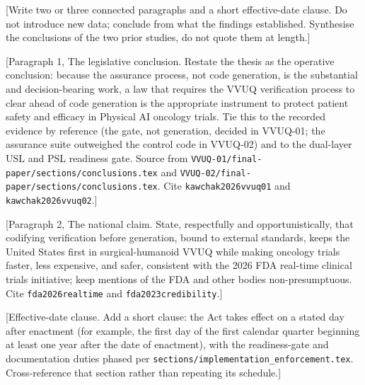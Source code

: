 
[Write two or three connected paragraphs and a short effective-date clause. Do not
introduce new data; conclude from what the findings established. Synthesise the
conclusions of the two prior studies, do not quote them at length.]

[Paragraph 1, The legislative conclusion. Restate the thesis as the operative
conclusion: because the assurance process, not code generation, is the
substantial and decision-bearing work, a law that requires the VVUQ verification
process to clear ahead of code generation is the appropriate instrument to protect
patient safety and efficacy in Physical AI oncology trials. Tie this to the
recorded evidence by reference (the gate, not generation, decided in VVUQ-01; the
assurance suite outweighed the control code in VVUQ-02) and to the dual-layer USL
and PSL readiness gate. Source from
\texttt{VVUQ-01/final-paper/sections/conclusions.tex} and
\texttt{VVUQ-02/final-paper/sections/conclusions.tex}. Cite
\texttt{kawchak2026vvuq01} and \texttt{kawchak2026vvuq02}.]

[Paragraph 2, The national claim. State, respectfully and opportunistically, that
codifying verification before generation, bound to external standards, keeps the
United States first in surgical-humanoid VVUQ while making oncology trials faster,
less expensive, and safer, consistent with the 2026 FDA real-time clinical trials
initiative; keep mentions of the FDA and other bodies non-presumptuous. Cite
\texttt{fda2026realtime} and \texttt{fda2023credibility}.]

[Effective-date clause. Add a short clause: the Act takes effect on a stated day
after enactment (for example, the first day of the first calendar quarter
beginning at least one year after the date of enactment), with the readiness-gate
and documentation duties phased per
\texttt{sections/implementation\_enforcement.tex}. Cross-reference that section
rather than repeating its schedule.]
